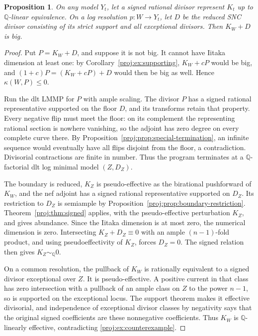 \documentclass[11pt,letterpaper]{article}
\newtheorem{proposition}[theorem]{Proposition}
\theoremstyle{definition}
\theoremstyle{remark}
\begin{document}
\begin{proposition}\label{proj:prop:signed-alternative}
On any model \(Y_t\), let a signed rational divisor
represent \(K_t\) up to \(\mathbb{Q}\)-linear equivalence. On a
log resolution \(p:W\to Y_t\), let \(D\) be the reduced
SNC divisor consisting of its strict support and all
exceptional divisors. Then \(K_W+D\) is big.
\end{proposition}
\begin{proof}
Put \(P=K_W+D\), and suppose it is not big. It cannot
have Iitaka dimension at least one: by
Corollary~\ref{proj:ex:supporting}, \(K_W+cP\) would be big,
and
\((1+c)P=(K_W+cP)+D\) would then be big as well.
Hence \(\kappa(W,P)\leq0\).

Run the dlt LMMP for \(P\) with ample scaling.
The divisor \(P\) has a signed rational representative
supported on the floor \(D\), and its transforms retain
that property. Every negative flip must meet the floor:
on its complement the representing rational section is
nowhere vanishing, so the adjoint has zero degree on
every complete curve there. By
Proposition~\ref{proj:prop:special-termination}, an infinite
sequence would eventually have all flips disjoint from
the floor, a contradiction. Divisorial contractions
are finite in number. Thus the program terminates at
a \(\mathbb{Q}\)-factorial dlt log minimal model
\((Z,D_Z)\).

The boundary is reduced, \(K_Z\) is pseudo-effective
as the birational pushforward of \(K_W\), and the nef
adjoint has a signed rational representative supported
on \(D_Z\). Its restriction to \(D_Z\) is semiample
by Proposition~\ref{proj:prop:boundary-restriction}.
Theorem~\ref{proj:thm:signed} applies, with the
pseudo-effective perturbation \(K_Z\), and gives
abundance. Since the Iitaka dimension is at most zero,
the numerical dimension is zero. Intersecting
\(K_Z+D_Z\equiv0\) with an ample
\((n-1)\)-fold product, and using pseudoeffectivity of
\(K_Z\), forces \(D_Z=0\). The signed relation then
gives \(K_Z\sim_\mathbb{Q}0\).

On a common resolution, the pullback of \(K_W\) is
rationally equivalent to a signed divisor exceptional
over \(Z\). It is pseudo-effective. A positive current
in that class has zero intersection with a pullback
of an ample class on \(Z\) to the power \(n-1\),
so is supported on the exceptional locus. The support
theorem makes it effective divisorial, and independence
of exceptional divisor classes by negativity says that
the original signed coefficients are these nonnegative
coefficients. Thus \(K_W\) is \(\mathbb{Q}\)-linearly effective,
contradicting \eqref{proj:ex:counterexample}.
\end{proof}
\end{document}
